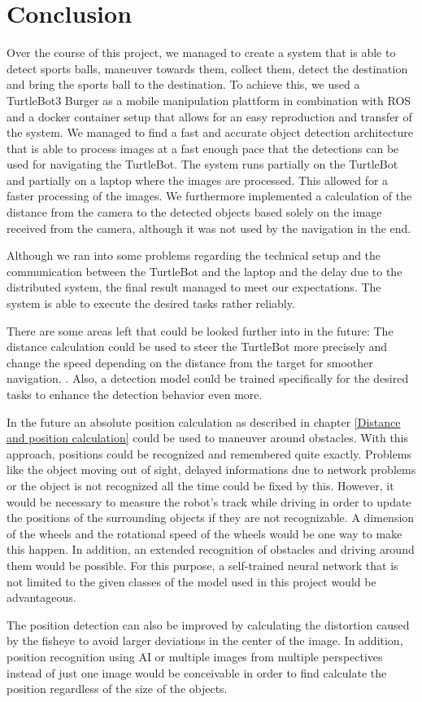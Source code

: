 \section{Conclusion}

Over the course of this project, we managed to create a system that is able to detect sports balls, maneuver towards them, collect them, detect the destination and bring the sports ball to the destination. To achieve this, we used a TurtleBot3 Burger as a mobile manipulation plattform in combination with \ac{ROS} and a docker container setup that allows for an easy reproduction and transfer of the system. We managed to find a fast and accurate object detection architecture that is able to process images at a fast enough pace that the detections can be used for navigating the TurtleBot. The system runs partially on the TurtleBot and partially on a laptop where the images are processed. This allowed for a faster processing of the images. We furthermore implemented a calculation of the distance from the camera to the detected objects based solely on the image received from the camera, although it was not used by the navigation in the end.

Although we ran into some problems regarding the technical setup and the communication between the TurtleBot and the laptop and the delay due to the distributed system, the final result managed to meet our expectations. The system is able to execute the desired tasks rather reliably. 

There are some areas left that could be looked further into in the future: The distance calculation could be used to steer the TurtleBot more precisely and change the speed depending on the distance from the target for smoother navigation. . Also, a detection model could be trained specifically for the desired tasks to enhance the detection behavior even more.

In the future an absolute position calculation as described in chapter \ref{Distance and position calculation} could be used to maneuver around obstacles. With this approach, positions could be recognized and remembered quite exactly. Problems like the object moving out of sight, delayed informations due to network problems or the object is not recognized all the time could be fixed by this.  However, it would be necessary to measure the robot's track while driving in order to update the positions of the surrounding objects if they are not recognizable. A dimension of the wheels and the rotational speed of the wheels would be one way to make this happen. In addition, an extended recognition of obstacles and driving around them would be possible. For this purpose, a self-trained neural network that is not limited to the given classes of the model used in this project would be advantageous.

The position detection can also be improved by calculating the distortion caused by the fisheye to avoid larger deviations in the center of the image. In addition, position recognition using \ac{AI} or multiple images from multiple perspectives instead of just one image would be conceivable in order to find calculate the position regardless of the size of the objects.